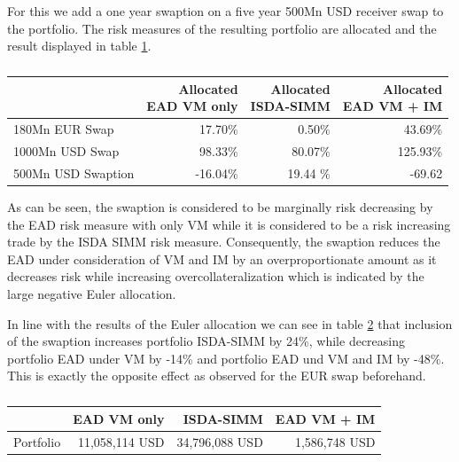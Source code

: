 \documentclass[../Thesis_AHoecherl.tex]{subfiles}
\begin{document}
    For this we add a one year swaption on a five year 500Mn USD receiver swap to the portfolio. The risk measures of the resulting portfolio are allocated and the result displayed in table \ref{tab:3TradeRatesAllocation}.

    \begin{table}[htbp]
        \centering
        \begin{tabular}{l||r|r|r}
                & \makecell{Allocated \\ EAD VM only} &\makecell{Allocated \\ ISDA-SIMM} &\makecell{Allocated \\ EAD VM + IM} \\
                \toprule
        180Mn EUR Swap & 17.70\% & 0.50\% & 43.69\% \\
        1000Mn USD Swap & 98.33\% & 80.07\% & 125.93\% \\
        500Mn USD Swaption & -16.04\% & 19.44 \% & -69.62\\
        \end{tabular}%
        \caption{}
        \label{tab:3TradeRatesAllocation}%
    \end{table}%
    As can be seen, the swaption is considered to be marginally risk decreasing by the EAD risk measure with only VM while it is considered to be a risk increasing trade by the \gls{ISDA SIMM} risk measure. Consequently, the swaption reduces the EAD under consideration of VM and IM by an overproportionate amount as it decreases risk while increasing overcollateralization which is indicated by the large negative Euler allocation.

    In line with the results of the Euler allocation we can see in table \ref{tab:3TradeRatesResults} that inclusion of the swaption increases portfolio ISDA-SIMM by 24\%, while decreasing portfolio EAD under VM by -14\% and portfolio EAD und VM and IM by -48\%. This is exactly the opposite effect as observed for the EUR swap beforehand.

    \begin{table}[htbp]
        \centering
        \begin{tabular}{l||r|r|r}
                & EAD VM only &ISDA-SIMM & EAD VM + IM \\
                \toprule
        Portfolio & 11,058,114 USD & 34,796,088 USD & 1,586,748 USD \\
        \end{tabular}%
        \caption{}
        \label{tab:3TradeRatesResults}%
    \end{table}%
\end{document}
